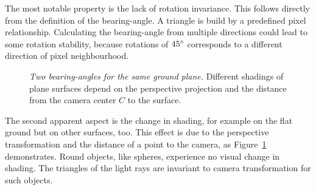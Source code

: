 The most notable property is the lack of rotation invariance.
This follows directly from the definition of the \gls{bearing-angle}.
A triangle is build by a predefined pixel relationship.
Calculating the \gls{bearing-angle} from multiple directions could lead to some rotation stability, because rotations of $45\degree$ corresponds to a different direction of pixel neighbourhood.
\begin{figure}[tb]
    \centering
    \caption[Two \glspl{bearing-angle} for the same ground plane]{\emph{Two \glspl{bearing-angle} for the same ground plane.} Different shadings of plane surfaces depend on the perspective projection and the distance from the camera center $C$ to the surface.}\label{fig:bearing_angle_shading}
\end{figure}
The second apparent aspect is the change in shading, for example on the flat ground but on other surfaces, too.
This effect is due to the perspective transformation and the distance of a point to the camera, as Figure~\ref{fig:bearing_angle_shading} demonstrates.
Round objects, like spheres, experience no visual change in shading.
The triangles of the light rays are invariant to camera transformation for such objects.
